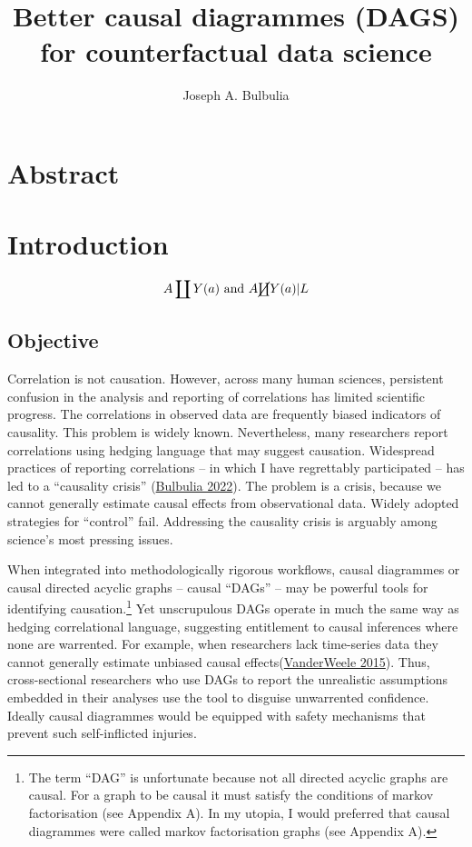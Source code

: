 \documentclass[
  singlecolumn]{report}
\title{Better causal diagrammes (DAGS) for counterfactual data science}
\author{Joseph A. Bulbulia}
\date{}
\begin{document}
\maketitle
\ifdefined\Shaded\renewenvironment{Shaded}{\begin{tcolorbox}[boxrule=0pt, frame hidden, borderline west={3pt}{0pt}{shadecolor}, interior hidden, sharp corners, breakable, enhanced]}{\end{tcolorbox}}\fi

\listoffigures
\listoftables
\hypertarget{abstract}{%
\section{Abstract}\label{abstract}}

\hypertarget{introduction}{%
\section{Introduction}\label{introduction}}

\[A \coprod Y(a)$ and $A \cancel{\coprod} Y(a)| L\]

\hypertarget{objective}{%
\subsection{Objective}\label{objective}}

Correlation is not causation. However, across many human sciences,
persistent confusion in the analysis and reporting of correlations has
limited scientific progress. The correlations in observed data are
frequently biased indicators of causality. This problem is widely known.
Nevertheless, many researchers report correlations using hedging
language that may suggest causation. Widespread practices of reporting
correlations -- in which I have regrettably participated -- has led to a
``causality crisis'' (\protect\hyperlink{ref-bulbulia2022}{Bulbulia
2022}). The problem is a crisis, because we cannot generally estimate
causal effects from observational data. Widely adopted strategies for
``control'' fail. Addressing the causality crisis is arguably among
science's most pressing issues.

When integrated into methodologically rigorous workflows, causal
diagrammes or causal directed acyclic graphs -- causal ``DAGs'' -- may
be powerful tools for identifying causation.\footnote{The term ``DAG''
  is unfortunate because not all directed acyclic graphs are causal. For
  a graph to be causal it must satisfy the conditions of markov
  factorisation (see Appendix A). In my utopia, I would preferred that
  causal diagrammes were called markov factorisation graphs (see
  Appendix A).} Yet unscrupulous DAGs operate in much the same way as
hedging correlational language, suggesting entitlement to causal
inferences where none are warrented. For example, when researchers lack
time-series data they cannot generally estimate unbiased causal
effects(\protect\hyperlink{ref-vanderweele2015}{VanderWeele 2015}).
Thus, cross-sectional researchers who use DAGs to report the unrealistic
assumptions embedded in their analyses use the tool to disguise
unwarrented confidence. Ideally causal diagrammes would be equipped with
safety mechanisms that prevent such self-inflicted injuries.
\end{document}
